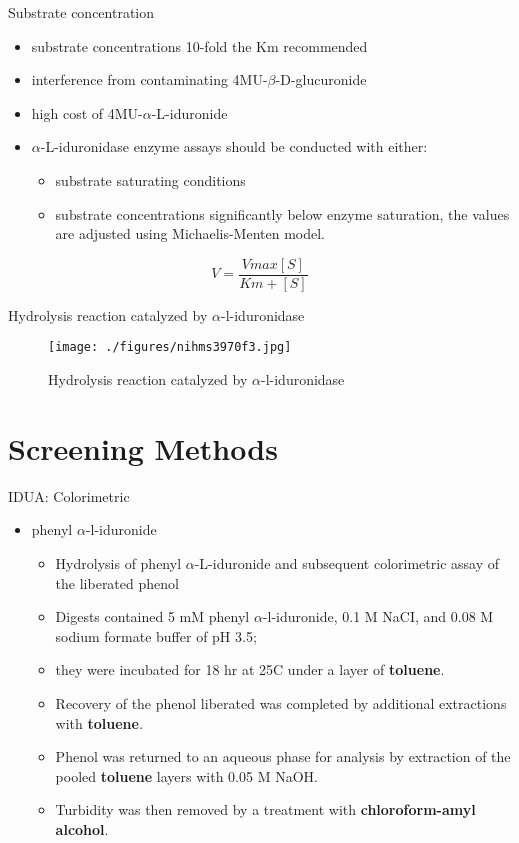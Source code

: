\documentclass[presentation, smaller]{beamer}
\begin{document}
\begin{frame}[label={sec:orgheadline6}]{Substrate concentration}
\begin{itemize}
\item substrate concentrations 10-fold the Km recommended
\item interference from contaminating 4MU-\(\beta\)-D-glucuronide
\item high cost of 4MU-\(\alpha\)-L-iduronide
\item \(\alpha\)-L-iduronidase enzyme assays should be conducted with either:
\begin{itemize}
\item substrate saturating conditions
\item substrate concentrations significantly below enzyme saturation,
the values are adjusted using Michaelis-Menten model.
\end{itemize}
\end{itemize}

\[ 
V  = \frac{Vmax[S]}{Km + [S]}
\]
\end{frame}


\begin{frame}[label={sec:orgheadline7}]{Hydrolysis reaction catalyzed by \(\alpha\)-l-iduronidase}
\begin{figure}[htb]
\centering
\texttt{[image: ./figures/nihms3970f3.jpg]}
\caption[mech]{\label{fig:mech}
Hydrolysis reaction catalyzed by \(\alpha\)-l-iduronidase}
\end{figure}
\end{frame}

\section{Screening Methods}
\label{sec:orgheadline21}

\begin{frame}[label={sec:orgheadline9}]{IDUA: Colorimetric}
\begin{itemize}
\item phenyl \(\alpha\)-l-iduronide
\begin{itemize}
\item Hydrolysis of phenyl \(\alpha\)-L-iduronide and subsequent
colorimetric assay of the liberated phenol
\item Digests contained 5 mM phenyl \(\alpha\)-l-iduronide, 0.1 M NaCI,
and 0.08 M sodium formate buffer of pH 3.5;
\item they were incubated for 18 hr at 25\degree C under a layer of \textbf{toluene}.
\item Recovery of the phenol liberated was completed by additional extractions with \textbf{toluene}.
\item Phenol was returned to an aqueous phase for analysis by extraction of the pooled \textbf{toluene} layers with 0.05 M NaOH.
\item Turbidity was then removed by a treatment with \textbf{chloroform-amyl alcohol}.
\end{itemize}
\end{itemize}
\end{frame}
\end{document}
